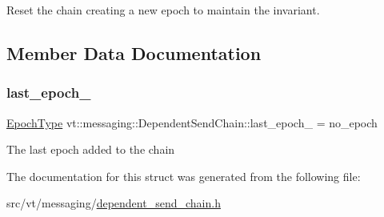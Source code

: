Reset the chain creating a new epoch to maintain the invariant. 



\subsection{Member Data Documentation}
\mbox{\label{classvt_1_1messaging_1_1_dependent_send_chain_acbba3599015aff00654f3cb8efaba623}} 
\subsubsection{\texorpdfstring{last\+\_\+epoch\+\_\+}{last\_epoch\_}}
{\footnotesize\ttfamily \hyperlink{namespacevt_a81d11b28122d43bf9834577e4a06440f}{Epoch\+Type} vt\+::messaging\+::\+Dependent\+Send\+Chain\+::last\+\_\+epoch\+\_\+ = no\+\_\+epoch\hspace{0.3cm}{\ttfamily [private]}}

The last epoch added to the chain 

The documentation for this struct was generated from the following file\+:\begin{DoxyCompactItemize}
\item 
src/vt/messaging/\hyperlink{dependent__send__chain_8h}{dependent\+\_\+send\+\_\+chain.\+h}\end{DoxyCompactItemize}
